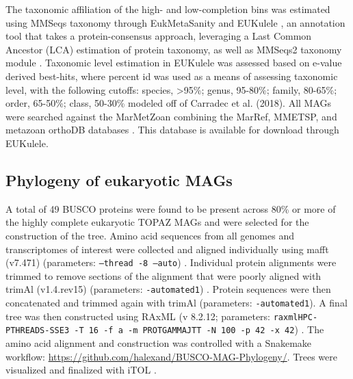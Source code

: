 \documentclass[12pt]{article}
\numberwithin{equation}{section}
\begin{document}
The taxonomic affiliation of the high- and low-completion bins was estimated using MMSeqs taxonomy through EukMetaSanity and EUKulele \citep{Krinos2021EUKulele}, an annotation tool that takes a protein-consensus approach, leveraging a Last Common Ancestor (LCA) estimation of protein taxonomy, as well as MMSeqs2 taxonomy module \citep{Steinegger2017, Steinegger2018, Mirdita2019}. Taxonomic level estimation in EUKulele was assessed based on e-value derived best-hits, where percent id was used as a means of assessing taxonomic level, with the following cutoffs: species, >95\%; genus, 95-80\%; family, 80-65\%; order, 65-50\%; class, 50-30\% modeled off of Carradec et al. (2018). All MAGs were searched against the MarMetZoan combining the MarRef, MMETSP, and metazoan orthoDB databases \citep{Johnson2018Re-assembly, Keeling2014, Kriventseva2018, Klemetsen:2017fg}. This database is available for download through EUKulele. 

\subsection*{Phylogeny of eukaryotic MAGs} 
A total of 49 BUSCO proteins were found to be present across 80\% or more of the highly complete eukaryotic TOPAZ MAGs and were selected for the construction of the tree. Amino acid sequences from all genomes and transcriptomes of interest were collected and aligned individually using mafft (v7.471) (parameters: \texttt{--thread -8 –auto}) \citep{Katoh2013MAFFT}. Individual protein alignments were trimmed to remove sections of the alignment that were poorly aligned with trimAl (v1.4.rev15) (parameters: \texttt{-automated1}) \citep{Capella-Gutierrez2009trimAl}. Protein sequences were then concatenated and trimmed again with trimAl (parameters: \texttt{-automated1}). A final tree was then constructed using RAxML (v 8.2.12; parameters: \texttt{raxmlHPC-PTHREADS-SSE3 -T 16 -f a -m PROTGAMMAJTT -N 100 -p 42 -x 42}) \citep{Stamatakis2014RAxML}. The amino acid alignment and construction was controlled with a Snakemake workflow: \url{https://github.com/halexand/BUSCO-MAG-Phylogeny/}. Trees were visualized and finalized with iTOL \citep{Letunic2016Interactive}. 
\end{document}
